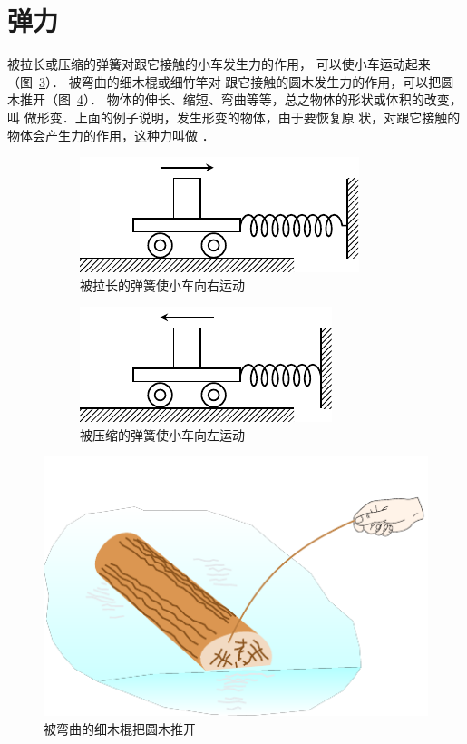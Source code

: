 \section{弹力} 
被拉长或压缩的弹簧对跟它接触的小车发生力的作用，
可以使小车运动起来（图~\ref{fig_A_1-5}）．
被弯曲的细木棍或细竹竿对
跟它接触的圆木发生力的作用，可以把圆木推开（图~\ref{fig_A_1-6}）．
物体的伸长、缩短、弯曲等等，总之物体的形状或体积的改变，叫
做形变．上面的例子说明，发生形变的物体，由于要恢复原
状，对跟它接触的物体会产生力的作用，这种力叫做 ．

\begin{figure}[htbp]
    \centering
    \begin{subfigure} {0.48\linewidth} 
        \centering
        \includegraphics{fig/A/1-5a.pdf} 
        \caption{被拉长的弹簧使小车向右运动} \label{fig_A_1-5a} 
    \end{subfigure} 
    \hfill 
    \begin{subfigure} {0.48\linewidth} 
        \centering
        \includegraphics{fig/A/1-5b.pdf} 
        \caption{被压缩的弹簧使小车向左运动} \label{fig_A_1-5b} 
    \end{subfigure} 
    \caption{} \label{fig_A_1-5}
\end{figure} 

\begin{figure}[htbp]
    \centering
    \includegraphics{fig/A/1-6.pdf} 
    \caption{被弯曲的细木棍把圆木推开} \label{fig_A_1-6} 
\end{figure} 

